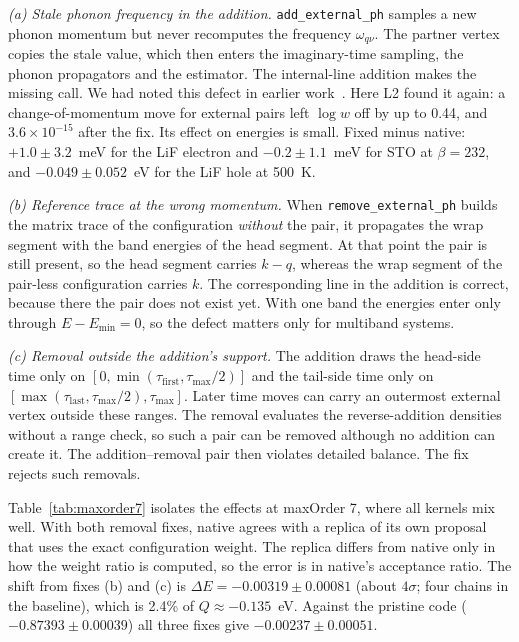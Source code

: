 \documentclass[aps,prb,reprint,superscriptaddress,nofootinbib]{revtex4-2}
\newcommand{\code}[1]{\texttt{#1}}
\begin{document}
\emph{(a) Stale phonon frequency in the addition.} \code{add\_external\_ph} samples a new phonon momentum but never recomputes the frequency $\omega_{q\nu}$. The partner vertex copies the stale value, which then enters the imaginary-time sampling, the phonon propagators and the estimator. The internal-line addition makes the missing call. We had noted this defect in earlier work~\cite{FutureB}. Here L2 found it again: a change-of-momentum move for external pairs left $\log w$ off by up to 0.44, and $3.6\times10^{-15}$ after the fix. Its effect on energies is small. Fixed minus native: $+1.0\pm3.2$~meV for the LiF electron and $-0.2\pm1.1$~meV for STO at $\beta=232$, and $-0.049\pm0.052$~eV for the LiF hole at 500~K.

\emph{(b) Reference trace at the wrong momentum.} When \code{remove\_external\_ph} builds the matrix trace of the configuration \emph{without} the pair, it propagates the wrap segment with the band energies of the head segment. At that point the pair is still present, so the head segment carries $k-q$, whereas the wrap segment of the pair-less configuration carries $k$. The corresponding line in the addition is correct, because there the pair does not exist yet. With one band the energies enter only through $E-E_{\min}=0$, so the defect matters only for multiband systems.

\emph{(c) Removal outside the addition's support.} The addition draws the head-side time only on $[0,\min(\tau_{\mathrm{first}},\tau_{\max}/2)]$ and the tail-side time only on $[\max(\tau_{\mathrm{last}},\tau_{\max}/2),\tau_{\max}]$. Later time moves can carry an outermost external vertex outside these ranges. The removal evaluates the reverse-addition densities without a range check, so such a pair can be removed although no addition can create it. The addition--removal pair then violates detailed balance. The fix rejects such removals.

Table~\ref{tab:maxorder7} isolates the effects at maxOrder 7, where all kernels mix well. With both removal fixes, native agrees with a replica of its own proposal that uses the exact configuration weight. The replica differs from native only in how the weight ratio is computed, so the error is in native's acceptance ratio. The shift from fixes (b) and (c) is $\Delta E=-0.00319\pm0.00081$ (about $4\sigma$; four chains in the baseline), which is 2.4\% of $Q\approx-0.135$~eV. Against the pristine code ($-0.87393\pm0.00039$) all three fixes give $-0.00237\pm0.00051$.
\end{document}
